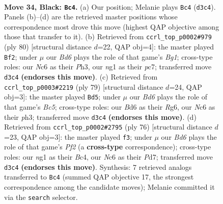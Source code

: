 \documentclass[11pt]{article}
\begin{document}
\clearpage

\begin{figure}[p]\centering
\begin{subfigure}{0.46\textwidth}\centering
\resizebox{\linewidth}{!}{%
\newchessgame
\chessboard[
  setfen={8/1k6/2nb2p1/6P1/p7/3b4/5B2/4K1N1 b - - 3 34},
  showmover=false,
  pgfstyle=straightmove, color=movearrow, markmove={d3-c4}
]}
\caption{}
\end{subfigure}\hfill
\begin{subfigure}{0.46\textwidth}\centering
\resizebox{\linewidth}{!}{%
\newchessgame
\chessboard[
  setfen={8/2p5/6p1/3k2P1/1K2b3/7P/8/6B1 w - - 7 41},
  showmover=false,
  pgfstyle=straightmove, color=movearrow, markmove={g1-f2}
]}
\caption{}
\end{subfigure}
\\[4pt]
\begin{subfigure}{0.46\textwidth}\centering
\resizebox{\linewidth}{!}{%
\newchessgame
\chessboard[
  setfen={3N4/7k/6r1/1p6/1Pb2B2/7P/3K4/8 b - - 0 40},
  showmover=false,
  pgfstyle=straightmove, color=movearrow, markmove={c4-d5}
]}
\caption{}
\end{subfigure}\hfill
\begin{subfigure}{0.46\textwidth}\centering
\resizebox{\linewidth}{!}{%
\newchessgame
\chessboard[
  setfen={8/3Pb2p/5k2/3K4/2B2p2/8/5P1P/8 w - - 0 39},
  showmover=false,
  pgfstyle=straightmove, color=movearrow, markmove={f2-f3}
]}
\caption{}
\end{subfigure}
\caption{\textbf{Move 34, Black: \texttt{Bc4}.} (a) Our position; Melanie plays \texttt{Bc4} (\texttt{d3c4}). Panels (b)--(d) are the retrieved master positions whose correspondence most drove this move (highest QAP objective among those that transfer to it). (b) Retrieved from \texttt{ccrl\_top\_p0002\#979} (ply 80) [structural distance $d$=22, QAP obj=4]: the master played \texttt{Bf2}; under $\mu$ our \emph{Bd6} plays the role of that game's \emph{Bg1}; cross-type roles: our \emph{N}c6 as their \emph{P}h3, our \emph{n}g1 as their \emph{p}c7; transferred move \texttt{d3c4} \textbf{(endorses this move)}. (c) Retrieved from \texttt{ccrl\_top\_p0003\#2219} (ply 79) [structural distance $d$=24, QAP obj=3]: the master played \texttt{Bd5}; under $\mu$ our \emph{Bd6} plays the role of that game's \emph{Bc5}; cross-type roles: our \emph{B}d6 as their \emph{R}g6, our \emph{N}c6 as their \emph{p}h3; transferred move \texttt{d3c4} \textbf{(endorses this move)}. (d) Retrieved from \texttt{ccrl\_top\_p0002\#2795} (ply 76) [structural distance $d$=23, QAP obj=3]: the master played \texttt{f3}; under $\mu$ our \emph{Bd6} plays the role of that game's \emph{Pf2} (a \textbf{cross-type} correspondence); cross-type roles: our \emph{n}g1 as their \emph{B}c4, our \emph{N}c6 as their \emph{P}d7; transferred move \texttt{d3c4} \textbf{(endorses this move)}. Synthesis: 7 retrieved analogs transferred to \texttt{Bc4} (summed QAP objective 17, the strongest correspondence among the candidate moves); Melanie committed it via the \texttt{search} selector.}
\label{fig:thought-m67}
\end{figure}
\end{document}
